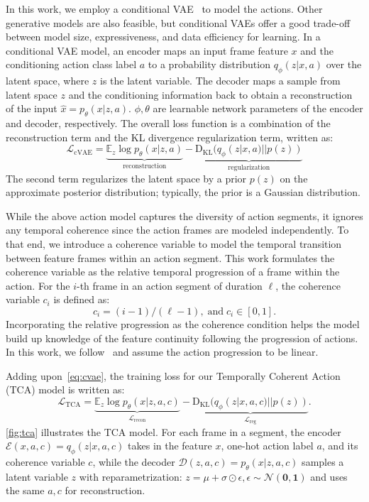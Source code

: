 In this work, we employ a conditional VAE~\cite{sohn2015cvae} to model the actions. Other generative models are also feasible, but conditional VAEs offer a good trade-off between model size, expressiveness, and data efficiency for learning. In a conditional VAE model, an encoder maps an input frame feature $x$ and the conditioning action class label $a$ to a probability distribution $q_{\phi}(z|x, a)$ over the latent space, where $z$ is the latent variable. The decoder maps a sample from latent space $z$ and the conditioning information back to obtain a reconstruction of the input $\hat{x}= p_{\theta}(x|z, a)$. $\phi,\theta$ are learnable network parameters of the encoder and decoder, respectively. The overall loss function is a combination of the reconstruction term and the KL divergence regularization term, written as:
\begin{equation*}\label{eq:cvae}
    \mathcal{L}_{\text{cVAE}} = \underbrace{\mathbb{E}_z \log p_{\theta}(x|z,a)}_{\text{reconstruction}} - \underbrace{\text{D}_{\text{KL}}(q_{\phi}(z|x,a)||p(z))}_{\text{regularization}}
\end{equation*}
The second term regularizes the latent space by a prior $p(z)$ on the approximate posterior distribution; typically, the prior is a Gaussian distribution. 



While the above action model captures the diversity of action segments, it ignores any temporal coherence since the action frames are modeled independently. To that end, we introduce a coherence variable to model the temporal transition between feature frames within an action segment. This work formulates the coherence variable as the relative temporal progression of a frame within the action. For the $i$-th frame in an action segment of duration $\ell$, the coherence variable $c_i$ is defined as: 
\begin{equation}\label{eq:covar}
    c_i = (i-1)/(\ell-1), \;\text{and}\; c_i \in [0, 1].
\end{equation}
Incorporating the relative progression as the coherence condition helps the model build up knowledge of the feature continuity following the progression of actions. In this work, we follow~\cite{becattini2020done} and assume the action progression to be linear.  

Adding upon~\cref{eq:cvae}, the training loss for our Temporally Coherent Action (TCA) model is written as:
\begin{equation}\label{eq:tca}
    \mathcal{L}_{\text{TCA}} = \underbrace{\mathbb{E}_z \log p_{\theta}(x|z,a,c)}_{\mathcal{L}_{\text{recon}}} - \underbrace{\text{D}_{\text{KL}}(q_{\phi}(z|x,a,c)||p(z))}_{\mathcal{L}_{\text{reg}}}.
\end{equation}
\cref{fig:tca} illustrates the TCA model. For each frame in a segment, the encoder $\mathcal{E}(x,a,c) = q_{\phi}(z|x,a,c)$ takes in the feature $x$, one-hot action label $a$, and its coherence variable $c$, while the decoder $\mathcal{D}(z,a,c) = p_{\theta}(x|z,a,c)$ samples a latent variable $z$ with reparametrization: $z = \mu + \sigma \odot \epsilon, \epsilon \sim \mathcal{N}(\mathbf{0},\mathbf{1})$ and uses the same $a,c$ for reconstruction.


